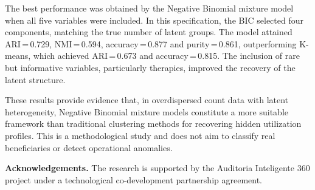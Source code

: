 \documentclass[11pt]{article}
\begin{document}
The best performance was obtained by the Negative Binomial mixture model
when all five variables were included.
In this specification, the BIC selected four
components, matching the true number of latent groups.
The model attained ARI\,=\,0.729,
NMI\,=\,0.594, accuracy\,=\,0.877
and purity\,=\,0.861, outperforming K-means, which achieved
ARI\,=\,0.673 and accuracy\,=\,0.815.
The inclusion of rare but informative variables, particularly therapies,
improved the recovery of the latent structure.

These results provide evidence that, in overdispersed count data
with latent heterogeneity, Negative Binomial mixture models constitute a
more suitable framework than traditional clustering methods for recovering
hidden utilization profiles.
This is a methodological study and does not aim to classify real
beneficiaries or detect operational anomalies.

\textbf{Acknowledgements.} The research is supported
by the Auditoria Inteligente 360 project under a technological
co-development partnership agreement.
\end{document}
